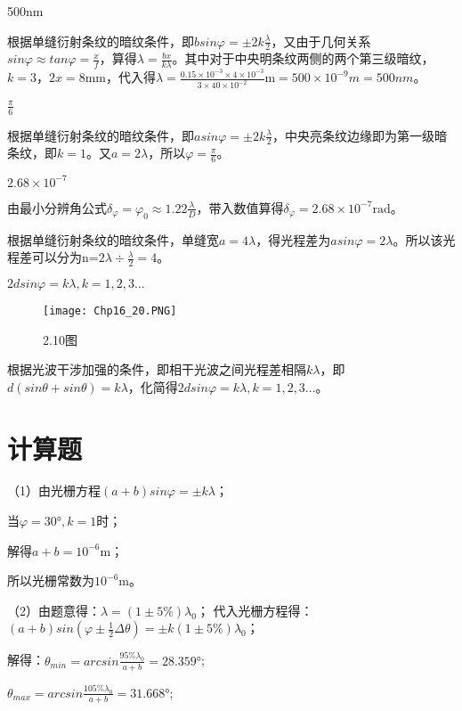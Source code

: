 \exercise 500nm

\solve
根据单缝衍射条纹的暗纹条件，即$bsin\varphi=\pm2k\frac{\lambda}{2}$，又由于几何关系$sin\varphi\approx tan\varphi=\frac{x}{f}$，算得$\lambda=\frac{bx}{k\lambda}$。其中对于中央明条纹两侧的两个第三级暗纹，$k=3$，$2x=8\mathrm{mm}$，代入得$\lambda=\frac{0.15\times10^{-3}\times4\times10^{-3}}{3\times40\times10^{-2}}\mathrm{m}=500\times10^{-9}m=500nm$。

\exercise $\frac{\pi}{6}$

\solve
根据单缝衍射条纹的暗纹条件，即$asin\varphi=\pm2k\frac{\lambda}{2}$，中央亮条纹边缘即为第一级暗条纹，即$k=1$。又$a=2\lambda$，所以$\varphi=\frac{\pi}{6}$。

\exercise $2.68\times10^{-7}$

\solve
由最小分辨角公式$\delta_\varphi=\varphi_0\approx1.22\frac{\lambda}{D}$，带入数值算得$\delta_\varphi=2.68\times10^{-7}\mathrm{rad}$。


\solve
根据单缝衍射条纹的暗纹条件，单缝宽$a=4\lambda$，得光程差为$asin\varphi=2\lambda$。所以该光程差可以分为n=$2\lambda\div\frac{\lambda}{2}=4$。

\exercise $2dsin\varphi=k\lambda,k=1,2,3...$

\solve
\begin{figure}[!h]
\centering
\texttt{[image: Chp16\_20.PNG]}
\caption{2.10图}
\end{figure}

根据光波干涉加强的条件，即相干光波之间光程差相隔$k\lambda$，即$d(sin\theta+sin\theta)=k\lambda$，化简得$2dsin\varphi=k\lambda,k=1,2,3...$。
\section{计算题}
\exercise

\solve
（1）由光栅方程$(a+b)sin\varphi=\pm k\lambda$；

当$\varphi=30°,k=1$时；

解得$a+b=10^{-6}\mathrm{m}$；

所以光栅常数为$10^{-6}\mathrm{m}$。

（2）由题意得：$\lambda=(1\pm5\% ) \lambda_0$；
\quad 代入光栅方程得：$(a+b)sin(\varphi\pm\frac{1}{2}\Delta\theta)=\pm k(1\pm5\%)\lambda_0$；

解得：$\theta_{min}=arcsin\frac{95\%\lambda_0}{a+b}=28.359°$;

$\theta_{max}=arcsin\frac{105\%\lambda_0}{a+b}=31.668°$;

